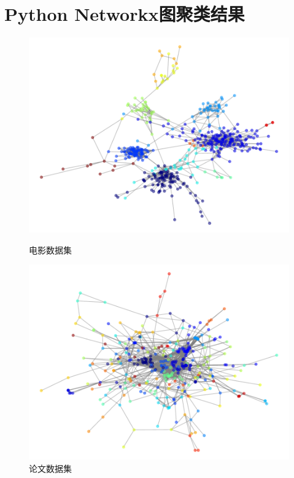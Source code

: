 \documentclass[UTF8, onecolumn, a4paper]{article}
\begin{document}
\section{Python Networkx图聚类结果}
\begin{center}
	\begin{figure}[ht] %
		\centering %
		\begin{minipage}[b]{0.95\linewidth} %
			\begin{minipage}[b]{0.47\linewidth} %
				\centering
				\includegraphics[width=\linewidth]{../pictures/movie_graph}
				\caption{电影数据集}
			\end{minipage}
			\hfill
			\begin{minipage}[b]{0.46\linewidth}
				\centering
				\includegraphics[width=\linewidth]{../pictures/paper_graph}
				\caption{论文数据集}
			\end{minipage}
		\end{minipage}
	\end{figure}
\end{center}
\end{document}
